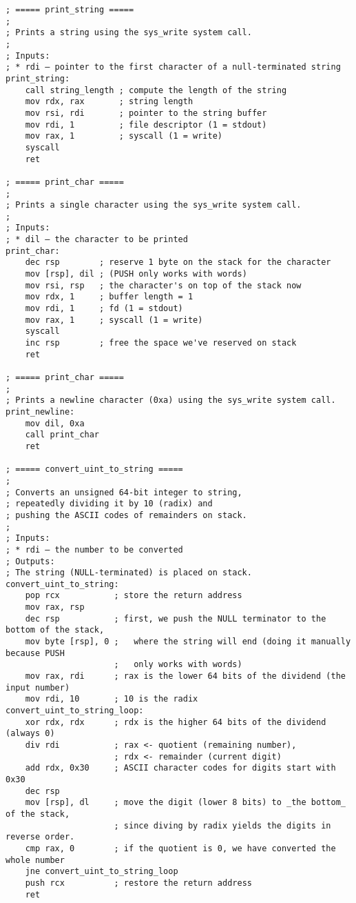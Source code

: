 \documentclass[12pt,a4paper]{report}
\begin{document}
\begin{lstlisting}[basicstyle=\scriptsize]
; ===== print_string =====
;
; Prints a string using the sys_write system call.
;
; Inputs:
; * rdi — pointer to the first character of a null-terminated string
print_string:
    call string_length ; compute the length of the string
    mov rdx, rax       ; string length
    mov rsi, rdi       ; pointer to the string buffer
    mov rdi, 1         ; file descriptor (1 = stdout)
    mov rax, 1         ; syscall (1 = write)
    syscall
    ret

; ===== print_char =====
;
; Prints a single character using the sys_write system call.
;
; Inputs:
; * dil — the character to be printed
print_char:
    dec rsp        ; reserve 1 byte on the stack for the character
    mov [rsp], dil ; (PUSH only works with words)
    mov rsi, rsp   ; the character's on top of the stack now
    mov rdx, 1     ; buffer length = 1
    mov rdi, 1     ; fd (1 = stdout)
    mov rax, 1     ; syscall (1 = write)
    syscall
    inc rsp        ; free the space we've reserved on stack
    ret

; ===== print_char =====
;
; Prints a newline character (0xa) using the sys_write system call.
print_newline:
    mov dil, 0xa
    call print_char
    ret

; ===== convert_uint_to_string =====
;
; Converts an unsigned 64-bit integer to string,
; repeatedly dividing it by 10 (radix) and
; pushing the ASCII codes of remainders on stack.
;
; Inputs:
; * rdi — the number to be converted
; Outputs:
; The string (NULL-terminated) is placed on stack.
convert_uint_to_string:
    pop rcx           ; store the return address
    mov rax, rsp
    dec rsp           ; first, we push the NULL terminator to the bottom of the stack,
    mov byte [rsp], 0 ;   where the string will end (doing it manually because PUSH
                      ;   only works with words)
    mov rax, rdi      ; rax is the lower 64 bits of the dividend (the input number)
    mov rdi, 10       ; 10 is the radix
convert_uint_to_string_loop:
    xor rdx, rdx      ; rdx is the higher 64 bits of the dividend (always 0)
    div rdi           ; rax <- quotient (remaining number),
                      ; rdx <- remainder (current digit)
    add rdx, 0x30     ; ASCII character codes for digits start with 0x30
    dec rsp
    mov [rsp], dl     ; move the digit (lower 8 bits) to _the bottom_ of the stack,
                      ; since diving by radix yields the digits in reverse order.
    cmp rax, 0        ; if the quotient is 0, we have converted the whole number
    jne convert_uint_to_string_loop
    push rcx          ; restore the return address
    ret


\end{lstlisting}
\end{document}
